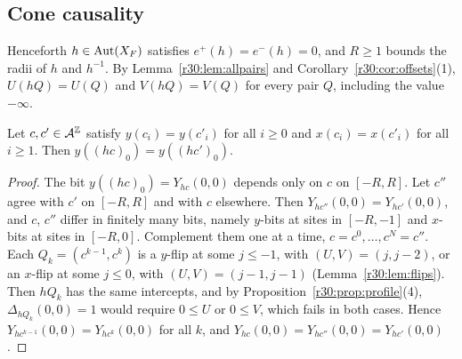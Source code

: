 \subsection{Cone causality}\label{r30:sec:cone}

Henceforth $h\in\operatorname{Aut}(X_F)$ satisfies $e^+(h)=e^-(h)=0$, and $R\ge1$ bounds the radii of $h$ and $h^{-1}$. By Lemma~\ref{r30:lem:allpairs} and Corollary~\ref{r30:cor:offsets}(1), $U(hQ)=U(Q)$ and $V(hQ)=V(Q)$ for every pair $Q$, including the value $-\infty$.

\begin{proposition}\label{r30:prop:cone}
Let $c,c'\in\mathcal{A}^{\mathbb{Z}}$ satisfy $y(c_i)=y(c'_i)$ for all $i\ge0$ and $x(c_i)=x(c'_i)$ for all $i\ge1$. Then $y((hc)_0)=y((hc')_0)$.
\end{proposition}

\begin{proof}
The bit $y((hc)_0)=Y_{hc}(0,0)$ depends only on $c$ on $[-R,R]$. Let $c''$ agree with $c'$ on $[-R,R]$ and with $c$ elsewhere. Then $Y_{hc''}(0,0)=Y_{hc'}(0,0)$, and $c$, $c''$ differ in finitely many bits, namely $y$-bits at sites in $[-R,-1]$ and $x$-bits at sites in $[-R,0]$. Complement them one at a time, $c=c^0,\dots,c^N=c''$. Each $Q_k=(c^{k-1},c^k)$ is a $y$-flip at some $j\le-1$, with $(U,V)=(j,j-2)$, or an $x$-flip at some $j\le0$, with $(U,V)=(j-1,j-1)$ (Lemma~\ref{r30:lem:flips}). Then $hQ_k$ has the same intercepts, and by Proposition~\ref{r30:prop:profile}(4), $\Delta_{hQ_k}(0,0)=1$ would require $0\le U$ or $0\le V$, which fails in both cases. Hence $Y_{hc^{k-1}}(0,0)=Y_{hc^k}(0,0)$ for all $k$, and $Y_{hc}(0,0)=Y_{hc''}(0,0)=Y_{hc'}(0,0)$.
\end{proof}

